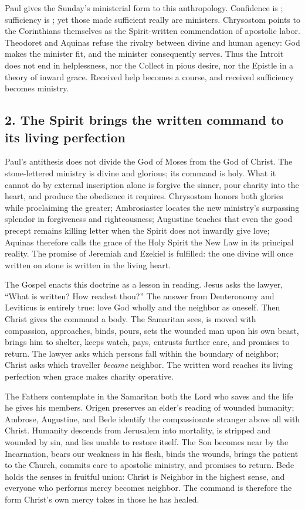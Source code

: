 Paul gives the Sunday's ministerial form to this anthropology. Confidence is
; sufficiency is ; yet those made
sufficient really are ministers. Chrysostom points to the Corinthians
themselves as the Spirit-written commendation of apostolic labor. Theodoret
and Aquinas refuse the rivalry between divine and human agency: God makes the
minister fit, and the minister consequently serves. Thus the Introit does not
end in helplessness, nor the Collect in pious desire, nor the Epistle in a
theory of inward grace. Received help becomes a course, and received
sufficiency becomes ministry.

\subsection*{2. The Spirit brings the written command to its living perfection }

Paul's antithesis does not divide the God of Moses from the God of Christ.
The stone-lettered ministry is divine and glorious; its command is holy. What
it cannot do by external inscription alone is forgive the sinner, pour charity
into the heart, and produce the obedience it requires. Chrysostom honors both
glories while proclaiming the greater; Ambrosiaster locates the new ministry's
surpassing splendor in forgiveness and righteousness; Augustine teaches that
even the good precept remains killing letter when the Spirit does not inwardly
give love; Aquinas therefore calls the grace of the Holy Spirit the New Law in
its principal reality. The promise of Jeremiah and Ezekiel is fulfilled: the
one divine will once written on stone is written in the living heart.

The Gospel enacts this doctrine as a lesson in reading. Jesus asks the lawyer,
``What is written? How readest thou?'' The answer from Deuteronomy and
Leviticus is entirely true: love God wholly and the neighbor as oneself. Then
Christ gives the command a body. The Samaritan sees, is moved with compassion,
approaches, binds, pours, sets the wounded man upon his own beast, brings him
to shelter, keeps watch, pays, entrusts further care, and promises to return.
The lawyer asks which persons fall within the boundary of neighbor; Christ
asks which traveller \emph{became} neighbor. The written word reaches its
living perfection when grace makes charity operative.

The Fathers contemplate in the Samaritan both the Lord who saves and the life
he gives his members. Origen preserves an elder's reading of wounded humanity;
Ambrose, Augustine, and Bede identify the compassionate stranger above all
with Christ. Humanity descends from Jerusalem into mortality, is stripped and
wounded by sin, and lies unable to restore itself. The Son becomes near by the
Incarnation, bears our weakness in his flesh, binds the wounds, brings the
patient to the Church, commits care to apostolic ministry, and promises to
return. Bede holds the senses in fruitful union: Christ is Neighbor in the
highest sense, and everyone who performs mercy becomes neighbor. The command
 is therefore the form Christ's own mercy takes in those
he has healed.


